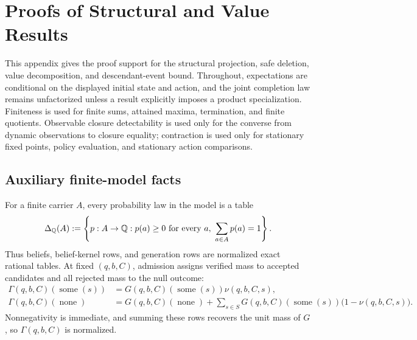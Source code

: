 \clearpage
\section{Proofs of Structural and Value Results}
\label{app:structural-proofs}

This appendix gives the proof support for the structural projection, safe
deletion, value decomposition, and descendant-event bound.  Throughout,
expectations are conditional on the displayed initial state and action, and
the joint completion law remains unfactorized unless a result explicitly
imposes a product specialization.  Finiteness is used for finite sums,
attained maxima, termination, and finite quotients.  Observable closure
detectability is used only for the converse from dynamic observations to
closure equality; contraction is used only for stationary fixed points,
policy evaluation, and stationary action comparisons.

\subsection{Auxiliary finite-model facts}
\label{app:ratprob}

For a finite carrier \(A\), every probability law in the model is a table
\[
  \Delta_{\mathbb{Q}}(A)
  :=\left\{p:A\to\mathbb{Q}:p(a)\ge0\ \text{for every }a,
  \ \sum_{a\in A}p(a)=1\right\}.
\]
Thus beliefs, belief-kernel rows, and generation rows are normalized exact
rational tables.  At fixed \((q,b,C)\), admission assigns verified mass to
accepted candidates and all rejected mass to the null outcome:
\begin{align}
  \Gamma(q,b,C)(\operatorname{some}(s))
    &=G(q,b,C)(\operatorname{some}(s))\nu(q,b,C,s),
    \label{eq:admitted-law-some}\\
  \Gamma(q,b,C)(\operatorname{none})
    &=G(q,b,C)(\operatorname{none})
      +\sum_{s\in S}G(q,b,C)(\operatorname{some}(s))
        \bigl(1-\nu(q,b,C,s)\bigr).
    \label{eq:admitted-law-none}
\end{align}
Nonnegativity is immediate, and summing these rows recovers the unit mass of
\(G\), so \(\Gamma(q,b,C)\) is normalized.

